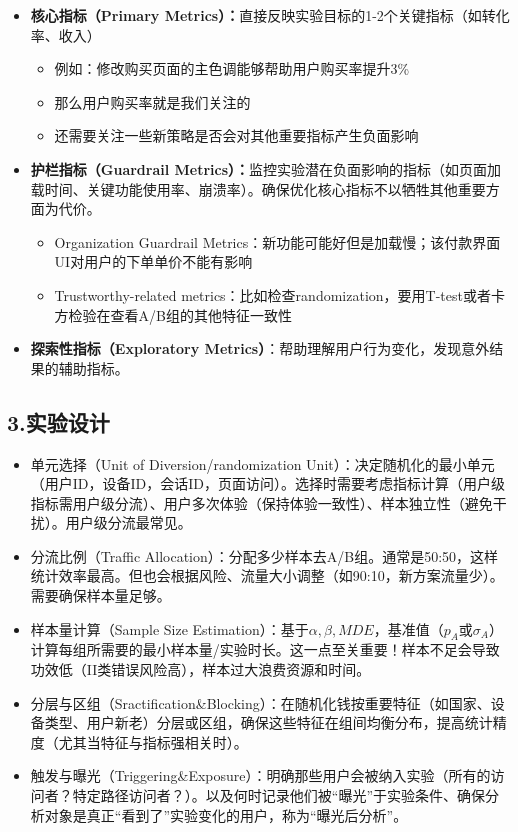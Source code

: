 \documentclass[
  letterpaper,
  DIV=11,
  numbers=noendperiod]{scrreprt}
\providecommand{\tightlist}{%
  \setlength{\itemsep}{0pt}\setlength{\parskip}{0pt}}
\begin{document}
\begin{itemize}
\tightlist
\item
  \textbf{核心指标（Primary
  Metrics）：}直接反映实验目标的1-2个关键指标（如转化率、收入）

  \begin{itemize}
  \item
    例如：修改购买页面的主色调能够帮助用户购买率提升3\%
  \item
    那么用户购买率就是我们关注的
  \item
    还需要关注一些新策略是否会对其他重要指标产生负面影响
  \end{itemize}
\item
  \textbf{护栏指标（Guardrail
  Metrics）：}监控实验潜在负面影响的指标（如页面加载时间、关键功能使用率、崩溃率）。确保优化核心指标不以牺牲其他重要方面为代价。

  \begin{itemize}
  \item
    Organization Guardrail
    Metrics：新功能可能好但是加载慢；该付款界面UI对用户的下单单价不能有影响
  \item
    Trustworthy-related
    metrics：比如检查randomization，要用T-test或者卡方检验在查看A/B组的其他特征一致性
  \end{itemize}
\item
  \textbf{探索性指标（Exploratory
  Metrics）}：帮助理解用户行为变化，发现意外结果的辅助指标。
\end{itemize}

\subsection{\texorpdfstring{3.\textbf{实验设计}}{3.实验设计}}\label{ux5b9eux9a8cux8bbeux8ba1}

\begin{itemize}
\item
  单元选择（Unit of Diversion/randomization
  Unit）：决定随机化的最小单元（用户ID，设备ID，会话ID，页面访问）。选择时需要考虑指标计算（用户级指标需用户级分流）、用户多次体验（保持体验一致性）、样本独立性（避免干扰）。用户级分流最常见。
\item
  分流比例（Traffic
  Allocation）：分配多少样本去A/B组。通常是50:50，这样统计效率最高。但也会根据风险、流量大小调整（如90:10，新方案流量少）。需要确保样本量足够。
\item
  样本量计算（Sample Size
  Estimation）：基于\(\alpha, \beta, MDE\)，基准值（\(p_A\)或\(\sigma_A\)）计算每组所需要的最小样本量/实验时长。这一点至关重要！样本不足会导致功效低（II类错误风险高），样本过大浪费资源和时间。
\item
  分层与区组（Sractification\&Blocking）：在随机化钱按重要特征（如国家、设备类型、用户新老）分层或区组，确保这些特征在组间均衡分布，提高统计精度（尤其当特征与指标强相关时）。
\item
  触发与曝光（Triggering\&Exposure）：明确那些用户会被纳入实验（所有的访问者？特定路径访问者？）。以及何时记录他们被``曝光''于实验条件、确保分析对象是真正``看到了''实验变化的用户，称为``曝光后分析''。
\end{itemize}
\end{document}
